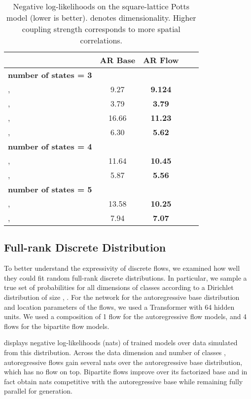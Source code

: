 \documentclass{article}
\begin{document}
\begin{table*}[!t]
\centering
\begin{tabular}{lcccc} \\  \toprule
& AR Base & AR Flow \\ \midrule
\textbf{number of states = 3} & & \\
\hfill  ,   & 9.27 & \textbf{9.124} \\
\hfill  ,   & 3.79 & \textbf{3.79} \\
\hfill  ,   & 16.66 & \textbf{11.23} \\
\hfill  ,   & 6.30 & \textbf{5.62} \\

\textbf{number of states = 4} & & \\
\hfill ,   & 11.64 & \textbf{10.45} \\
\hfill ,   & 5.87 & \textbf{5.56} \\

\textbf{number of states = 5} & & \\
\hfill ,   & 13.58 & \textbf{10.25} \\
\hfill ,   & 7.94 & \textbf{7.07} \\
\bottomrule
\end{tabular}
\caption{{Negative log-likelihoods on the square-lattice Potts model (lower is better).}  denotes dimensionality. Higher coupling strength  corresponds to more spatial correlations.}
\label{table:potts}
\end{table*}



\subsection{Full-rank Discrete Distribution}
To better understand the expressivity of discrete flows, we examined how well they could fit random full-rank discrete distributions. In particular, we sample a true set of probabilities for all  dimensions of  classes according to a Dirichlet distribution of size , .
For the network for the autoregressive base distribution and location parameters of the flows, we used a Transformer with 64 hidden units. We used a composition of 1 flow for the autoregressive flow models, and 4 flows for the bipartite flow models.

 displays negative log-likelihoods (nats) of trained models over data simulated from this distribution.
Across the data dimension  and number of classes , autoregressive flows gain several nats over the autoregressive base distribution, which has no flow on top.
Bipartite flows improve over its factorized base and in fact obtain nats competitive with the autoregressive base while remaining fully parallel for generation.
\end{document}
